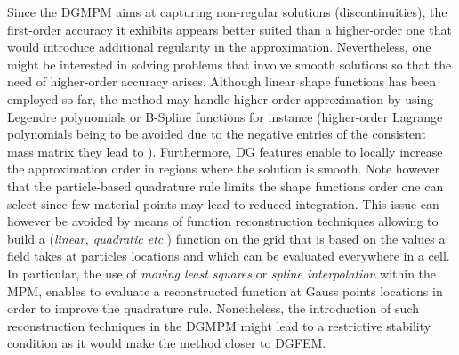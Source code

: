 Since the DGMPM aims at capturing non-regular solutions (discontinuities), the first-order accuracy it exhibits appears better suited than a higher-order one that would introduce additional regularity in the approximation.
Nevertheless, one might be interested in solving problems that involve smooth solutions so that the need of higher-order accuracy arises. Although linear shape functions has been employed so far, the method may handle higher-order approximation by using Legendre polynomials or B-Spline functions for instance (higher-order Lagrange polynomials being to be avoided due to the negative entries of the consistent mass matrix they lead to \cite{MPM_BSpline1}). Furthermore, DG features enable to locally increase the approximation order in regions where the solution is smooth. Note however that the particle-based quadrature rule limits the shape functions order one can select since few material points may lead to reduced integration. 
This issue can however be avoided by means of function reconstruction techniques allowing to build a (\textit{linear, quadratic etc.}) function on the grid that is based on the values a field takes at particles locations and which can be evaluated everywhere in a cell. In particular, the use of \textit{moving least squares} \cite{IMPM} or \textit{spline interpolation} \cite{MPM_BSpline1,MPM_BSpline2} within the MPM, enables to evaluate a reconstructed function at Gauss points locations in order to improve the quadrature rule.
Nonetheless, the introduction of such reconstruction techniques in the DGMPM might lead to a restrictive stability condition as it would make the method closer to DGFEM.


